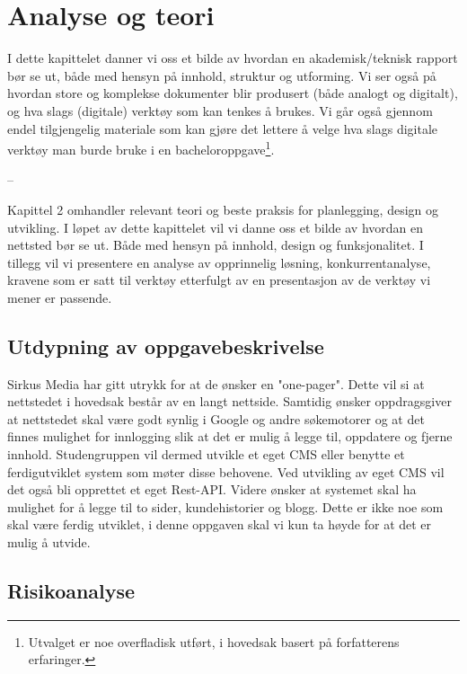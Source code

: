 \cleardoublepage
\chapter{Analyse og teori}
\label{chap:analysis}

I dette kapittelet danner vi oss et bilde av hvordan en akademisk/teknisk rapport bør se ut, både med hensyn på innhold, struktur og utforming. Vi ser også på hvordan store og komplekse dokumenter blir produsert (både analogt og digitalt), og hva slags (digitale) verktøy som kan tenkes å brukes. Vi går også gjennom endel tilgjengelig materiale som kan gjøre det lettere å velge hva slags digitale verktøy man burde bruke i en bacheloroppgave\footnote{Utvalget er noe overfladisk utført, i hovedsak basert på forfatterens erfaringer.}.

-- 

Kapittel 2 omhandler relevant teori og beste praksis for planlegging, design og utvikling. I løpet av dette kapittelet vil vi danne oss et bilde av hvordan en nettsted bør se ut. Både med hensyn på innhold, design og funksjonalitet. I tillegg vil vi presentere en analyse av opprinnelig løsning, konkurrentanalyse, kravene som er satt til verktøy etterfulgt av en presentasjon av de verktøy vi mener er passende.

\section{Utdypning av oppgavebeskrivelse}
Sirkus Media har gitt utrykk for at de ønsker en "one-pager". Dette vil si at nettstedet i hovedsak består av en langt nettside. Samtidig ønsker oppdragsgiver at nettstedet skal være godt synlig i Google og andre søkemotorer og at det finnes mulighet for innlogging slik at det er mulig å legge til, oppdatere og fjerne innhold. Studengruppen vil dermed utvikle et eget CMS eller benytte et ferdigutviklet system som møter disse behovene. Ved utvikling av eget CMS vil det også bli opprettet et eget Rest-API. Videre ønsker at systemet skal ha mulighet for å legge til to sider, kundehistorier og blogg. Dette er ikke noe som skal være ferdig utviklet, i denne oppgaven skal vi kun ta høyde for at det er mulig å utvide.

\section{Risikoanalyse}

